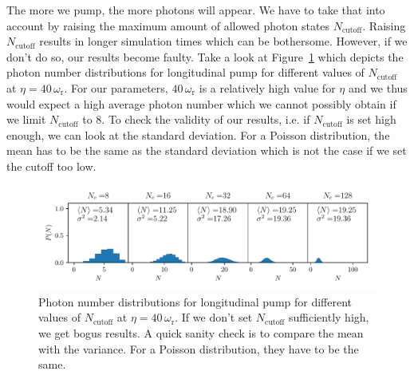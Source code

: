 \noindent The more we pump, the more photons will appear. We have to take that into account by raising the maximum amount of allowed photon states $N_\text{cutoff}$. Raising $N_\text{cutoff}$ results in longer simulation times which can be bothersome. However, if we don't do so, our results become faulty. Take a look at Figure~\ref{model_limit} which depicts the photon number distributions for longitudinal pump for different values of $N_\text{cutoff}$ at $\eta = 40 \, \omega_\text{r}$. For our parameters, $40 \, \omega_\text{r}$ is a relatively high value for $\eta$ and we thus would expect a high average photon number which we cannot possibly obtain if we limit $N_\text{cutoff}$ to 8. To check the validity of our results, i.e. if $N_\text{cutoff}$ is set high enough, we can look at the standard deviation. For a Poisson distribution, the mean has to be the same as the standard deviation which is not the case if we set the cutoff too low.

\begin{figure}[!htb]
	\centering
	\includegraphics[width=1\textwidth]{images/model_limit_long.pdf}
	\caption{Photon number distributions for longitudinal pump for different values of $N_\text{cutoff}$ at $\eta = 40 \, \omega_\text{r}$. If we don't set $N_\text{cutoff}$ sufficiently high, we get bogus results. A quick sanity check is to compare the mean with the variance. For a Poisson distribution, they have to be the same.}
	\label{model_limit}
\end{figure}
\FloatBarrier
